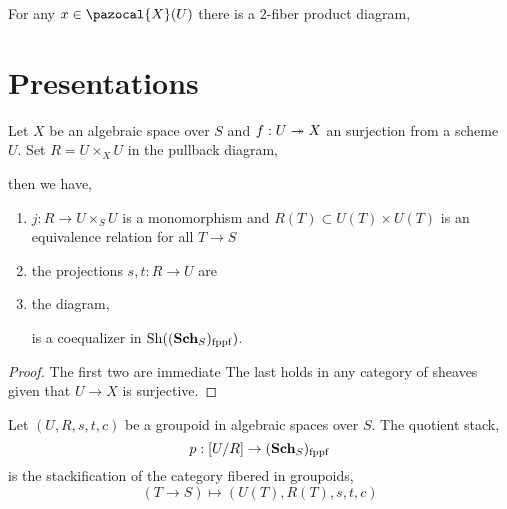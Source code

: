 \documentclass[12pt]{article}
\renewcommand{\X}{\pazocal{X}}
\begin{document}
\begin{prop}
For any $x \in \X(U)$ there is a $2$-fiber product diagram,
\begin{center}
\end{center}
\end{prop}

\section{Presentations}

\begin{prop}
Let $X$ be an algebraic space over $S$ and $f : U \twoheadrightarrow X$ an \etale surjection from a scheme $U$. Set $R = U \times_X U$ in the pullback diagram,
\begin{center}
\end{center}
then we have,
\begin{enumerate}
\item $j : R \to U \times_S U$ is a monomorphism and $R(T) \subset U(T) \times U(T)$ is an equivalence relation for all $T \to S$
\item the projections $s,t : R \to U$ are \etale
\item the diagram,
\begin{center}
\end{center}
is a coequalizer in $\mathrm{Sh}((\mathbf{Sch}_S)_{\mathrm{fppf}})$. 
\end{enumerate}
\end{prop}

\begin{proof}
The first two are immediate The last holds in any category of sheaves given that $U \to X$ is surjective. 
\end{proof}

\begin{defn}
Let $(U, R, s, t, c)$ be a groupoid in algebraic spaces over $S$. The quotient stack,
\[ p : [U/R] \to (\mathbf{Sch}_S)_{\mathrm{fppf}} \]
is the stackification of the category fibered in groupoids,
\[ (T \to S) \mapsto (U(T), R(T), s, t, c) \]
\end{defn}
\end{document}
